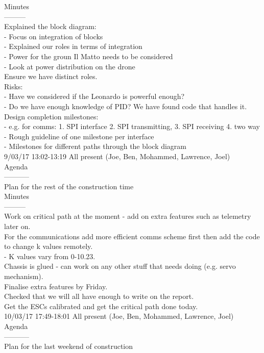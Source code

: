 \documentclass[a4paper,11pt]{article}
\begin{document}
Minutes\\
---------\\
Explained the block diagram:\\
	- Focus on integration of blocks\\
	- Explained our roles in terms of integration\\
	- Power for the groun Il Matto needs to be considered\\
	- Look at power distribution on the drone\\
Ensure we have distinct roles.\\
Risks:\\
	- Have we considered if the Leonardo is powerful enough?\\
	- Do we have enough knowledge of PID? We have found code that handles it.\\
Design completion milestones:\\
	- e.g. for comms: 1. SPI interface 2. SPI transmitting, 3. SPI receiving 4. two way\\
	- Rough guideline of one milestone per interface\\
	- Milestones for different paths through the block diagram\\

9/03/17 13:02-13:19 All present (Joe, Ben, Mohammed, Lawrence, Joel)\\
Agenda\\
-----------\\
Plan for the rest of the construction time\\

Minutes\\
---------\\
Work on critical path at the moment - add on extra features such as telemetry later on.\\
For the communications add more efficient comms scheme first then add the code to change k values remotely.\\
	- K values vary from 0-10.23.\\
Chassis is glued - can work on any other stuff that needs doing (e.g. servo mechanism).\\
Finalise extra features by Friday.\\
Checked that we will all have enough to write on the report.\\
Get the ESCs calibrated and get the critical path done today.\\

10/03/17 17:49-18:01 All present (Joe, Ben, Mohammed, Lawrence, Joel)\\
Agenda\\
-----------\\
Plan for the last weekend of construction\\
\end{document}
